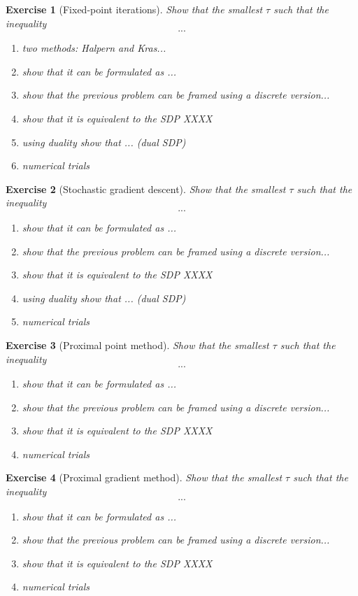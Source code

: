 \documentclass[11pt,a4paper]{article}
\newtheorem{exercise}{Exercise}
\begin{document}
	\begin{exercise}[Fixed-point iterations]
	Show that the smallest $\tau$ such that the inequality
	\[ ... \]
	\begin{enumerate}
	\item two methods: Halpern and Kras...
	\item show that it can be formulated as ...
	\item show that the previous problem can be framed using a discrete version...
	\item show that it is equivalent to the SDP XXXX
	\item using duality show that ... (dual SDP)
	\item numerical trials
	\end{enumerate}
	\end{exercise}
	
	
	\begin{exercise}[Stochastic gradient descent]
	Show that the smallest $\tau$ such that the inequality
	\[ ... \]
	\begin{enumerate}
	\item show that it can be formulated as ...
	\item show that the previous problem can be framed using a discrete version...
	\item show that it is equivalent to the SDP XXXX
	\item using duality show that ... (dual SDP)
	\item numerical trials
	\end{enumerate}
	\end{exercise}
	
	
	\begin{exercise}[Proximal point method]
	Show that the smallest $\tau$ such that the inequality
	\[ ... \]
	\begin{enumerate}
	\item show that it can be formulated as ...
	\item show that the previous problem can be framed using a discrete version...
	\item show that it is equivalent to the SDP XXXX
	\item numerical trials
	\end{enumerate}
	\end{exercise}
	
	
	\begin{exercise}[Proximal gradient method]
	Show that the smallest $\tau$ such that the inequality
	\[ ... \]
	\begin{enumerate}
	\item show that it can be formulated as ...
	\item show that the previous problem can be framed using a discrete version...
	\item show that it is equivalent to the SDP XXXX
	\item numerical trials
	\end{enumerate}
	\end{exercise}
	
\end{document}
